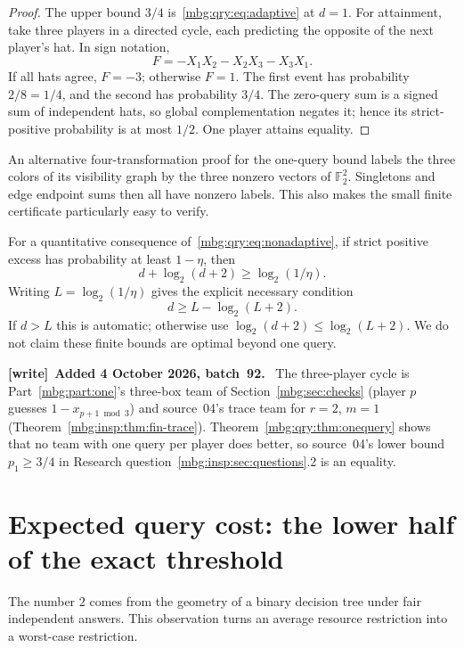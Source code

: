 \documentclass[11pt,letterpaper]{article}
\theoremstyle{definition}
\newcommand{\F}{\mathbb F}
\newenvironment{writenote}[1][]{\par\smallskip\begingroup\small
 \noindent\textbf{[write]}\if\relax\detokenize{#1}\relax\else~\textbf{#1.}\fi\ }%
 {\par\endgroup\smallskip}
\begin{document}
\begin{proof}
The upper bound \(3/4\) is~\eqref{mbg:qry:eq:adaptive} at \(d=1\).
For attainment, take three players in a directed cycle, each predicting
the opposite of the next player's hat. In sign notation,
\[
 F=-X_1X_2-X_2X_3-X_3X_1.
\]
If all hats agree, \(F=-3\); otherwise \(F=1\). The first event has
probability \(2/8=1/4\), and the second has probability \(3/4\).
The zero-query sum is a signed sum of independent hats, so global
complementation negates it; hence its strict-positive probability is
at most \(1/2\). One player attains equality.
\end{proof}

An alternative four-transformation proof for the one-query bound labels
the three colors of its visibility graph by the three nonzero vectors of
\(\F_2^2\). Singletons and edge endpoint sums then all have nonzero
labels. This also makes the small finite certificate particularly easy
to verify.

For a quantitative consequence of~\eqref{mbg:qry:eq:nonadaptive}, if strict
positive excess has probability at least \(1-\eta\), then
\[
 d+\log_2(d+2)\ge\log_2(1/\eta).
\]
Writing \(L=\log_2(1/\eta)\) gives the explicit necessary condition
\[
 d\ge L-\log_2(L+2).
\]
If \(d>L\) this is automatic; otherwise use
\(\log_2(d+2)\le\log_2(L+2)\). We do not claim these finite bounds are
optimal beyond one query.

\begin{writenote}[Added 4 October 2026, batch~92]
The three-player cycle is Part~\ref{mbg:part:one}'s three-box team of Section~\ref{mbg:sec:checks} (player $p$ guesses $1-x_{p+1\bmod3}$) and source~04's trace team for $r=2$, $m=1$ (Theorem~\ref{mbg:insp:thm:fin-trace}). Theorem~\ref{mbg:qry:thm:onequery} shows that no team with one query per player does better, so source~04's lower bound $p_1\ge3/4$ in Research question~\ref{mbg:insp:sec:questions}.2 is an equality.
\end{writenote}

\section{Expected query cost: the lower half of the exact threshold}
\label{mbg:qry:sec:expected}

The number \(2\) comes from the geometry of a binary decision tree under
fair independent answers. This observation turns an average resource
restriction into a worst-case restriction.
\end{document}
